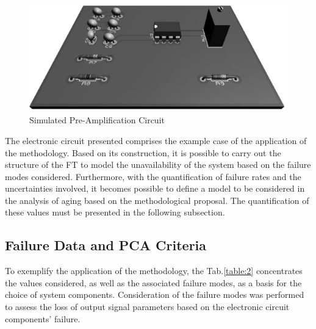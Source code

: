 \documentclass{ws-m3as}
\begin{document}
\begin{figure}[H]
	\centering  
	\includegraphics[width=1\linewidth]{Figures/Amp3D2}
	\caption{Simulated Pre-Amplification Circuit}
	\label{fig:19}
\end{figure}

The electronic circuit presented comprises the example case of the application of the methodology. Based on its construction, it is possible to carry out the structure of the FT to model the unavailability of the system based on the failure modes considered. Furthermore, with the quantification of failure rates and the uncertainties involved, it becomes possible to define a model to be considered in the analysis of aging based on the methodological proposal. The quantification of these values must be presented in the following subsection.

\subsection{Failure Data and PCA Criteria}

To exemplify the application of the methodology, the Tab.\ref{table:2} concentrates the values considered, as well as the associated failure modes, as a basis for the choice of system components. Consideration of the failure modes was performed to assess the loss of output signal parameters based on the electronic circuit components' failure.
\end{document}
